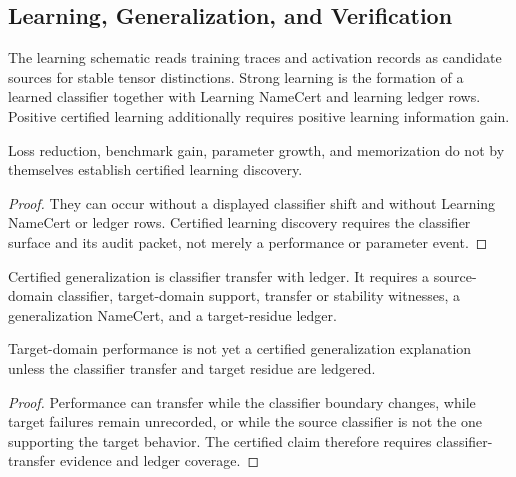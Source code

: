 \subsection{Learning, Generalization, and Verification}
\label{subsec:philosophy-learning-generalization-verification-schematic}

\begin{definition}
\label{def:philosophy-learning-schematic}
The learning schematic reads training traces and activation records as
candidate sources for stable tensor distinctions. Strong learning is the
formation of a learned classifier together with Learning NameCert and
learning ledger rows. Positive certified learning additionally requires
positive learning information gain.
\end{definition}

\begin{theorem}
\label{thm:philosophy-performance-movement-below-certified-learning}
Loss reduction, benchmark gain, parameter growth, and memorization do not
by themselves establish certified learning discovery.
\end{theorem}
\begin{proof}
They can occur without a displayed classifier shift and without Learning
NameCert or ledger rows. Certified learning discovery requires the
classifier surface and its audit packet, not merely a performance or
parameter event.
\end{proof}

\begin{definition}
\label{def:philosophy-generalization-schematic}
Certified generalization is classifier transfer with ledger. It requires
a source-domain classifier, target-domain support, transfer or stability
witnesses, a generalization NameCert, and a target-residue ledger.
\end{definition}

\begin{theorem}
\label{thm:philosophy-accuracy-transfer-below-certified-generalization}
Target-domain performance is not yet a certified generalization
explanation unless the classifier transfer and target residue are
ledgered.
\end{theorem}
\begin{proof}
Performance can transfer while the classifier boundary changes, while
target failures remain unrecorded, or while the source classifier is not
the one supporting the target behavior. The certified claim therefore
requires classifier-transfer evidence and ledger coverage.
\end{proof}

